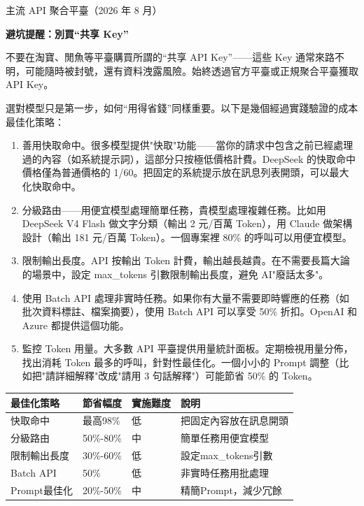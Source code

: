 \begin{center}\small\color{gray}主流 API 聚合平臺（2026 年 8 月）\end{center}

\textbf{避坑提醒：別買“共享 Key”}\par

不要在淘寶、閒魚等平臺購買所謂的“共享 API Key”——這些 Key 通常來路不明，可能隨時被封號，還有資料洩露風險。始終透過官方平臺或正規聚合平臺獲取 API Key。


選對模型只是第一步，如何“用得省錢”同樣重要。以下是幾個經過實踐驗證的成本最佳化策略：

\begin{enumerate}
  \item 善用快取命中。很多模型提供"快取"功能——當你的請求中包含之前已經處理過的內容（如系統提示詞），這部分只按極低價格計費。DeepSeek 的快取命中價格僅為普通價格的 1/60。把固定的系統提示放在訊息列表開頭，可以最大化快取命中。
  \item 分級路由——用便宜模型處理簡單任務，貴模型處理複雜任務。比如用 DeepSeek V4 Flash 做文字分類（輸出 2 元/百萬 Token），用 Claude 做架構設計（輸出 181 元/百萬 Token）。一個專案裡 80\% 的呼叫可以用便宜模型。
  \item 限制輸出長度。API 按輸出 Token 計費，輸出越長越貴。在不需要長篇大論的場景中，設定 max\_tokens 引數限制輸出長度，避免 AI"廢話太多"。
  \item 使用 Batch API 處理非實時任務。如果你有大量不需要即時響應的任務（如批次資料標註、檔案摘要），使用 Batch API 可以享受 50\% 折扣。OpenAI 和 Azure 都提供這個功能。
  \item 監控 Token 用量。大多數 API 平臺提供用量統計面板。定期檢視用量分佈，找出消耗 Token 最多的呼叫，針對性最佳化。一個小小的 Prompt 調整（比如把"請詳細解釋"改成"請用 3 句話解釋"）可能節省 50\% 的 Token。
\end{enumerate}

\begin{center}
\begin{tabularx}{\linewidth}{|X|X|X|X|}
\hline
\textbf{最佳化策略} & \textbf{節省幅度} & \textbf{實施難度} & \textbf{說明} \tabularnewline
\hline
快取命中 & 最高98\% & 低 & 把固定內容放在訊息開頭 \tabularnewline
分級路由 & 50\%-80\% & 中 & 簡單任務用便宜模型 \tabularnewline
限制輸出長度 & 30\%-60\% & 低 & 設定max\_tokens引數 \tabularnewline
Batch API & 50\% & 低 & 非實時任務用批處理 \tabularnewline
Prompt最佳化 & 20\%-50\% & 中 & 精簡Prompt，減少冗餘 \tabularnewline
\hline
\end{tabularx}
\end{center}

